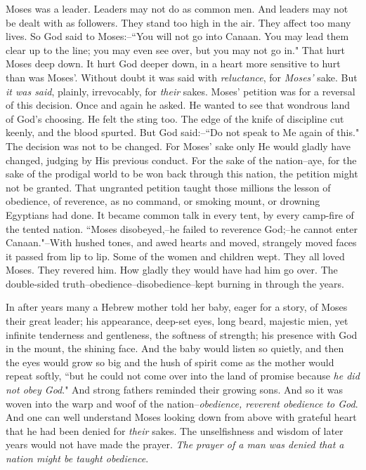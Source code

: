 Moses was a leader. Leaders may not do as common men. And leaders may not
be dealt with as followers. They stand too high in the air. They affect
too many lives. So God said to Moses:--``You will not go into Canaan. You
may lead them clear up to the line; you may even see over, but you may not
go in." That hurt Moses deep down. It hurt God deeper down, in a heart
more sensitive to hurt than was Moses'. Without doubt it was said with
\textit{reluctance}, for \textit{Moses'} sake. But \textit{it was said}, plainly, irrevocably,
for \textit{their} sakes. Moses' petition was for a reversal of this decision.
Once and again he asked. He wanted to see that wondrous land of God's
choosing. He felt the sting too. The edge of the knife of discipline cut
keenly, and the blood spurted. But God said:--``Do not speak to Me again of
this." The decision was not to be changed. For Moses' sake only He would
gladly have changed, judging by His previous conduct. For the sake of the
nation--aye, for the sake of the prodigal world to be won back through
this nation, the petition might not be granted. That ungranted petition
taught those millions the lesson of obedience, of reverence, as no
command, or smoking mount, or drowning Egyptians had done. It became
common talk in every tent, by every camp-fire of the tented nation. ``Moses
disobeyed,--he failed to reverence God;--he cannot enter Canaan."--With
hushed tones, and awed hearts and moved, strangely moved faces it passed
from lip to lip. Some of the women and children wept. They all loved
Moses. They revered him. How gladly they would have had him go over. The
double-sided truth--obedience--disobedience--kept burning in through the
years.

In after years many a Hebrew mother told her baby, eager for a story, of
Moses their great leader; his appearance, deep-set eyes, long beard,
majestic mien, yet infinite tenderness and gentleness, the softness of
strength; his presence with God in the mount, the shining face. And the
baby would listen so quietly, and then the eyes would grow so big and the
hush of spirit come as the mother would repeat softly, ``but he could not
come over into the land of promise because \textit{he did not obey God}." And
strong fathers reminded their growing sons. And so it was woven into the
warp and woof of the nation--\textit{obedience, reverent obedience to God}. And
one can well understand Moses looking down from above with grateful heart
that he had been denied for \textit{their} sakes. The unselfishness and wisdom of
later years would not have made the prayer. \textit{The prayer of a man was
denied that a nation might be taught obedience}.



